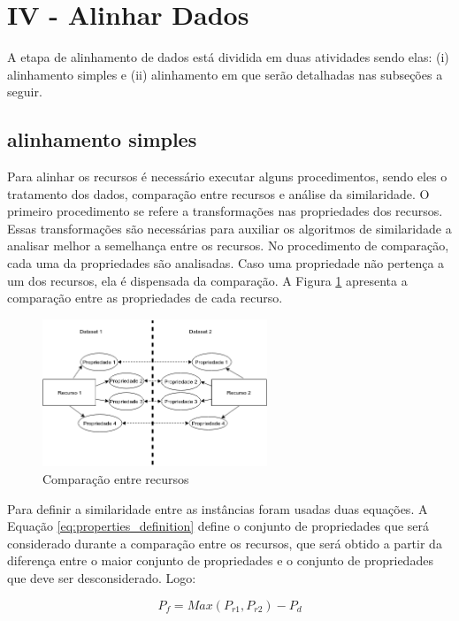 \section{IV - Alinhar Dados}
A etapa de alinhamento de dados está dividida em duas atividades sendo elas: (i) alinhamento simples e (ii) alinhamento em que serão detalhadas nas subseções a seguir.

\subsection{alinhamento simples}
\label{im_simples}
Para alinhar os recursos é necessário executar alguns procedimentos, sendo eles o tratamento dos dados, comparação entre recursos e análise da similaridade. O primeiro procedimento se refere a transformações nas propriedades dos recursos. Essas transformações são necessárias para auxiliar os algoritmos de similaridade a analisar melhor a semelhança entre os recursos. No procedimento de comparação, cada uma da propriedades são analisadas. Caso uma propriedade não pertença a um dos recursos, ela é dispensada da comparação. A Figura  \ref{fig:resources} apresenta a comparação entre as propriedades de cada recurso.

\begin{figure}[!h]
	\centering
	\includegraphics[width=0.6\textwidth]{./imagens/resources.png}
    \caption{Comparação entre recursos}
	\label{fig:resources}
\end{figure}

Para definir a similaridade entre as instâncias foram usadas duas equações. A Equação \ref{eq:properties_definition} define o conjunto de propriedades que será considerado durante a comparação entre os recursos, que será obtido a partir da diferença entre  o maior conjunto de propriedades e o conjunto de propriedades que deve ser desconsiderado. Logo:

\begin{equation}
P_f =M a x  ( P_{r1} ,P_{r2} ) - P_d
\label{eq:properties_definition}
\end{equation}


